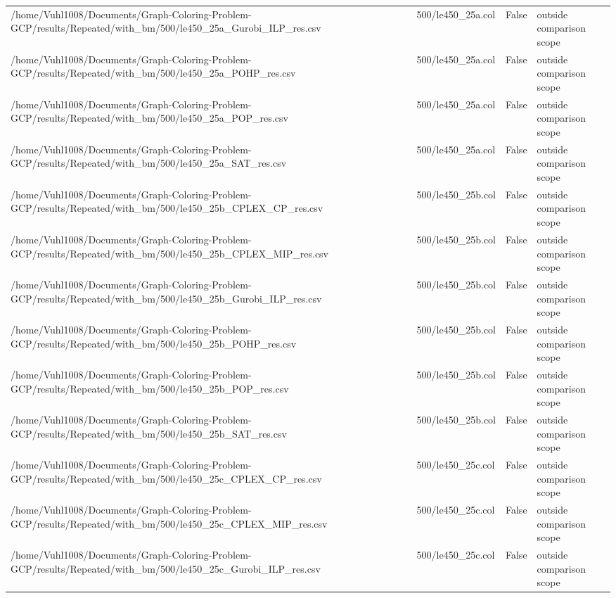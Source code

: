 \begin{table}[htbp]
\begin{tabular}{llll}
/home/Vuhl1008/Documents/Graph-Coloring-Problem-GCP/results/Repeated/with\_bm/500/le450\_25a\_Gurobi\_ILP\_res.csv & 500/le450\_25a.col & False & outside comparison scope \\
/home/Vuhl1008/Documents/Graph-Coloring-Problem-GCP/results/Repeated/with\_bm/500/le450\_25a\_POHP\_res.csv & 500/le450\_25a.col & False & outside comparison scope \\
/home/Vuhl1008/Documents/Graph-Coloring-Problem-GCP/results/Repeated/with\_bm/500/le450\_25a\_POP\_res.csv & 500/le450\_25a.col & False & outside comparison scope \\
/home/Vuhl1008/Documents/Graph-Coloring-Problem-GCP/results/Repeated/with\_bm/500/le450\_25a\_SAT\_res.csv & 500/le450\_25a.col & False & outside comparison scope \\
/home/Vuhl1008/Documents/Graph-Coloring-Problem-GCP/results/Repeated/with\_bm/500/le450\_25b\_CPLEX\_CP\_res.csv & 500/le450\_25b.col & False & outside comparison scope \\
/home/Vuhl1008/Documents/Graph-Coloring-Problem-GCP/results/Repeated/with\_bm/500/le450\_25b\_CPLEX\_MIP\_res.csv & 500/le450\_25b.col & False & outside comparison scope \\
/home/Vuhl1008/Documents/Graph-Coloring-Problem-GCP/results/Repeated/with\_bm/500/le450\_25b\_Gurobi\_ILP\_res.csv & 500/le450\_25b.col & False & outside comparison scope \\
/home/Vuhl1008/Documents/Graph-Coloring-Problem-GCP/results/Repeated/with\_bm/500/le450\_25b\_POHP\_res.csv & 500/le450\_25b.col & False & outside comparison scope \\
/home/Vuhl1008/Documents/Graph-Coloring-Problem-GCP/results/Repeated/with\_bm/500/le450\_25b\_POP\_res.csv & 500/le450\_25b.col & False & outside comparison scope \\
/home/Vuhl1008/Documents/Graph-Coloring-Problem-GCP/results/Repeated/with\_bm/500/le450\_25b\_SAT\_res.csv & 500/le450\_25b.col & False & outside comparison scope \\
/home/Vuhl1008/Documents/Graph-Coloring-Problem-GCP/results/Repeated/with\_bm/500/le450\_25c\_CPLEX\_CP\_res.csv & 500/le450\_25c.col & False & outside comparison scope \\
/home/Vuhl1008/Documents/Graph-Coloring-Problem-GCP/results/Repeated/with\_bm/500/le450\_25c\_CPLEX\_MIP\_res.csv & 500/le450\_25c.col & False & outside comparison scope \\
/home/Vuhl1008/Documents/Graph-Coloring-Problem-GCP/results/Repeated/with\_bm/500/le450\_25c\_Gurobi\_ILP\_res.csv & 500/le450\_25c.col & False & outside comparison scope \\

\end{tabular}
\end{table}
